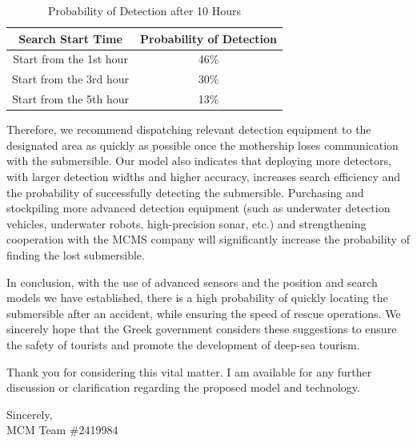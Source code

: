 \documentclass{mcmthesis}  %
\begin{document}
\begin{memo}[Memorandum]
		\begin{table}[h]
			\centering
			\caption{Probability of Detection after 10 Hours}
			\label{tab:detection_probability}
			\renewcommand{\arraystretch}{1.5} %
			\begin{tabular}{cc}
				\toprule
				\textbf{Search Start Time} & \textbf{Probability of Detection} \\
				\midrule
				Start from the 1st hour & 46\% \\
				Start from the 3rd hour & 30\% \\
				Start from the 5th hour & 13\% \\
				\bottomrule
			\end{tabular}
		\end{table}
		
		Therefore, we recommend dispatching relevant detection equipment to the designated area as quickly as possible once the mothership loses communication with the submersible. Our model also indicates that deploying more detectors, with larger detection widths and higher accuracy, increases search efficiency and the probability of successfully detecting the submersible. Purchasing and stockpiling more advanced detection equipment (such as underwater detection vehicles, underwater robots, high-precision sonar, etc.) and strengthening cooperation with the MCMS company will significantly increase the probability of finding the lost submersible.
		
		In conclusion, with the use of advanced sensors and the position and search models we have established, there is a high probability of quickly locating the submersible after an accident, while ensuring the speed of rescue operations. We sincerely hope that the Greek government considers these suggestions to ensure the safety of tourists and promote the development of deep-sea tourism.
		
		Thank you for considering this vital matter. I am available for any further discussion or clarification regarding the proposed model and technology.
		
		\vspace{2\baselineskip} %
		
		\begin{flushright}
			Sincerely,\\
			MCM Team \#2419984
		\end{flushright}
	\end{memo}  %
	
	\newpage
\end{document}
